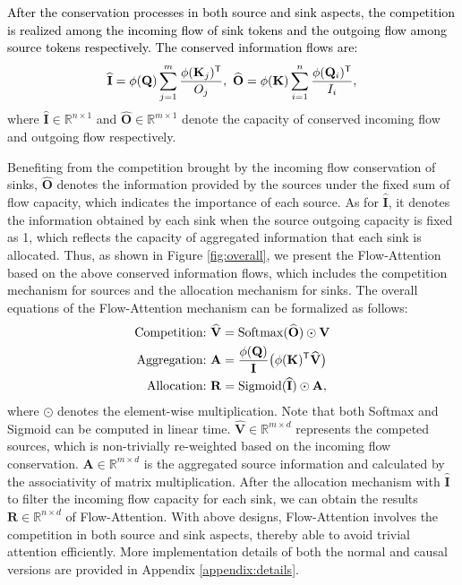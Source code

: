 \documentclass[nohyperref]{article}
\theoremstyle{plain}
\theoremstyle{definition}
\theoremstyle{remark}
\newcommand{\update}[1]{{\textcolor{black}{#1}}}
\begin{document}
\update{After the conservation processes in both source and sink aspects, the competition is realized among the incoming flow of sink tokens and the outgoing flow among source tokens respectively. The conserved information flows are:}
\begin{equation}
	\begin{split}\label{equ:conservation}
	    \widehat{\mathbf{I}}= \phi(\mathbf{Q})\sum_{j=1}^{m}\frac{\phi(\mathbf{K}_{j})^{\sf T}}{{O}_{j}},\ \widehat{\mathbf{O}}= \phi(\mathbf{K})\sum_{i=1}^{n}\frac{\phi(\mathbf{Q}_{i})^{\sf T}}{{I}_{i}},
	\end{split}
\end{equation}
where $\widehat{\mathbf{I}}\in\mathbb{R}^{n\times1}$ and $\widehat{\mathbf{O}}\in\mathbb{R}^{m\times1}$ denote the capacity of conserved incoming flow and outgoing flow respectively. 

Benefiting from the competition brought by the incoming flow conservation of sinks, $\widehat{\mathbf{O}}$ denotes the information provided by the sources under the fixed sum of flow capacity, which indicates the importance of each source. As for $\widehat{\mathbf{I}}$, it denotes the information obtained by each sink when the source outgoing capacity is fixed as 1, which reflects the capacity of aggregated information that each sink is allocated. Thus, as shown in Figure \ref{fig:overall}, we present the Flow-Attention based on the above conserved information flows, which includes the competition mechanism for sources and the allocation mechanism for sinks. The overall equations of the Flow-Attention mechanism can be formalized as follows:
\begin{equation}
	\begin{split}\label{equ:overall}
	    \text{Competition:}\ &\widehat{\mathbf{V}}=\operatorname{Softmax}(\widehat{\mathbf{O}})\odot\mathbf{V}\\
		\text{Aggregation:}\ &\mathbf{A}=\frac{\phi(\mathbf{Q})}{\mathbf{I}}\big(\phi(\mathbf{K})^{\sf T}\widehat{\mathbf{V}}\big)\\
		\text{Allocation:}\ &\mathbf{R}=\operatorname{Sigmoid}(\widehat{\mathbf{I}})\odot \mathbf{A},\\
	\end{split}
\end{equation}
where $\odot$ denotes the element-wise multiplication. Note that both Softmax and Sigmoid can be computed in linear time. $\widehat{\mathbf{V}}\in\mathbb{R}^{m\times d}$ represents the competed sources, which is non-trivially re-weighted based on the incoming flow conservation. ${\mathbf{A}}\in\mathbb{R}^{m\times d}$ is the aggregated source information and calculated by the associativity of matrix multiplication. After the allocation mechanism with $\widehat{\mathbf{I}}$ to filter the incoming flow capacity for each sink, we can obtain the results $\mathbf{R}\in\mathbb{R}^{n\times d}$ of Flow-Attention. With above designs, Flow-Attention involves the competition in both source and sink aspects, thereby able to avoid trivial attention efficiently. More implementation details of both the normal and causal versions are provided in Appendix \ref{appendix:details}.
\end{document}
